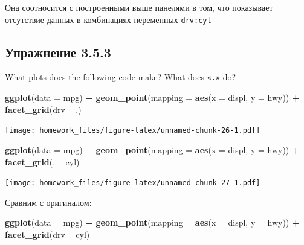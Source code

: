 \documentclass[]{book}
\newenvironment{Shaded}{\begin{snugshade}}{\end{snugshade}}
\newcommand{\KeywordTok}[1]{\textcolor[rgb]{0.13,0.29,0.53}{\textbf{#1}}}
\newcommand{\DataTypeTok}[1]{\textcolor[rgb]{0.13,0.29,0.53}{#1}}
\newcommand{\StringTok}[1]{\textcolor[rgb]{0.31,0.60,0.02}{#1}}
\newcommand{\OperatorTok}[1]{\textcolor[rgb]{0.81,0.36,0.00}{\textbf{#1}}}
\newcommand{\NormalTok}[1]{#1}
\begin{document}
Она соотносится с построенными выше панелями в том, что показывает
отсутствие данных в комбинациях переменных \texttt{drv:cyl}

\subsection*{Упражнение 3.5.3}\label{-3.5.3}

What plots does the following code make? What does \texttt{«.»} do?

\begin{Shaded}
\begin{Highlighting}[]
\KeywordTok{ggplot}\NormalTok{(}\DataTypeTok{data =}\NormalTok{ mpg) }\OperatorTok{+}\StringTok{ }
\StringTok{  }\KeywordTok{geom_point}\NormalTok{(}\DataTypeTok{mapping =} \KeywordTok{aes}\NormalTok{(}\DataTypeTok{x =}\NormalTok{ displ, }\DataTypeTok{y =}\NormalTok{ hwy)) }\OperatorTok{+}
\StringTok{  }\KeywordTok{facet_grid}\NormalTok{(drv }\OperatorTok{~}\StringTok{ }\NormalTok{.)}
\end{Highlighting}
\end{Shaded}

\texttt{[image: homework\_files/figure-latex/unnamed-chunk-26-1.pdf]}

\begin{Shaded}
\begin{Highlighting}[]
\KeywordTok{ggplot}\NormalTok{(}\DataTypeTok{data =}\NormalTok{ mpg) }\OperatorTok{+}\StringTok{ }
\StringTok{  }\KeywordTok{geom_point}\NormalTok{(}\DataTypeTok{mapping =} \KeywordTok{aes}\NormalTok{(}\DataTypeTok{x =}\NormalTok{ displ, }\DataTypeTok{y =}\NormalTok{ hwy)) }\OperatorTok{+}
\StringTok{  }\KeywordTok{facet_grid}\NormalTok{(. }\OperatorTok{~}\StringTok{ }\NormalTok{cyl)}
\end{Highlighting}
\end{Shaded}

\texttt{[image: homework\_files/figure-latex/unnamed-chunk-27-1.pdf]}

Сравним с оригиналом:

\begin{Shaded}
\begin{Highlighting}[]
\KeywordTok{ggplot}\NormalTok{(}\DataTypeTok{data =}\NormalTok{ mpg) }\OperatorTok{+}\StringTok{ }
\StringTok{  }\KeywordTok{geom_point}\NormalTok{(}\DataTypeTok{mapping =} \KeywordTok{aes}\NormalTok{(}\DataTypeTok{x =}\NormalTok{ displ, }\DataTypeTok{y =}\NormalTok{ hwy)) }\OperatorTok{+}
\StringTok{  }\KeywordTok{facet_grid}\NormalTok{(drv }\OperatorTok{~}\StringTok{ }\NormalTok{cyl)}
\end{Highlighting}
\end{Shaded}
\end{document}
